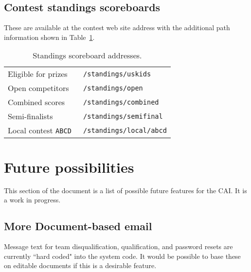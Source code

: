 \documentclass[11pt,letterpaper]{refart}
\begin{document}
\subsection{Contest standings scoreboards}
These are available at the contest web site address with the additional
path information shown in Table~\ref{tbl:scoreboards}.
\begin{table}
\centering
\caption{Standings scoreboard addresses.}
\begin{tabular}{l>{\tt}l}
Eligible for prizes & /standings/uskids \\
Open competitors & /standings/open \\
Combined scores & /standings/combined \\
Semi-finalists & /standings/semifinal \\
Local contest \texttt{ABCD} & /standings/local/abcd
\end{tabular}
\label{tbl:scoreboards}
\end{table}

\section{Future possibilities}
This section of the document is a list of possible future features for the CAI.  It is a work
in progress.

\subsection{More Document-based email}
Message text for team disqualification, qualification, and password resets are currently
``hard coded" into the system code.  It would be possible to base these on editable
documents if this is a desirable feature.
\end{document}
